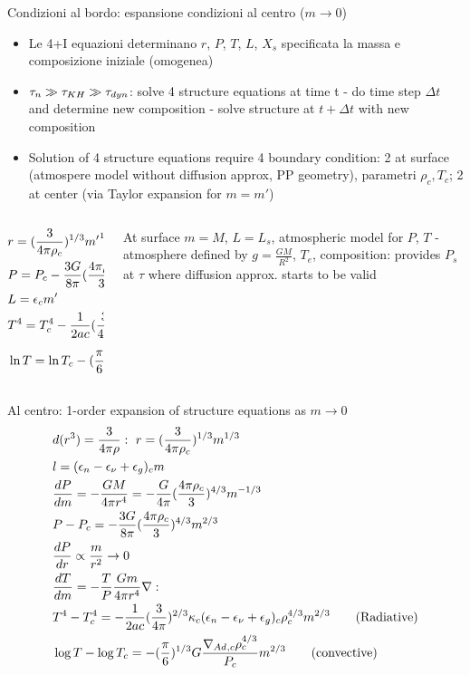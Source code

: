\begin{frame}{Condizioni al bordo: espansione condizioni al centro ($m\to0$)}
\begin{itemize}
\item Le 4+I equazioni determinano $r$, $P$, $T$, $L$, $X_s$ specificata la massa e composizione iniziale (omogenea)
\item $\tau_n\gg\tau_{KH}\gg\tau_{dyn}$: solve 4 structure equations at time t - do time step $\Delta t$ and determine new composition - solve structure at $t+\Delta t$ with new composition
\item Solution of 4 structure equations require 4 boundary condition: 2 at surface (atmospere model without diffusion approx, PP geometry), parametri $\rho_c,T_c$; 2 at center (via Taylor expansion for $m=m'$)
\end{itemize}
\begin{columns}[T]
\begin{column}{0.65\textwidth}
\begin{align*}
&r=(\frac{3}{4\pi\rho_c})^{1/3}{m'}^{1/3}\\
&P=P_c-\frac{3G}{8\pi}(\frac{4\pi\rho_c}{3})^{4/3}{m'}^{2/3}\\
&L=\epsilon_cm'\\
&T^4=T_c^4-\frac{1}{2ac}(\frac{3}{4\pi})^{2/3}\kappa_c\epsilon_c\rho_c^{4/3}{m'}^{2/3}\tag*{rad}\\
&\ln{T}=\ln{T_c}-(\frac{\pi}{6})^{1/3}G\frac{{\nabla_{Ad}}_c\rho_c^{4/3}}{P_c}{m'}^{2/3}\tag*{con}
\end{align*}
\end{column}
\begin{column}{0.35\textwidth}
At surface $m=M$, $L=L_s$, atmospheric model for $P$, $T$ - atmosphere defined by $g=\frac{GM}{R^2}$, $T_e$, composition: provides $P_s$ at $\tau$ where diffusion approx. starts to be valid
\end{column}
\end{columns}
\end{frame}

\begin{frame}[fragile]{Al centro: 1-order expansion of structure equations as $m\to0$}
	\begin{align*}
	&d(r^3)=\frac{3}{4\pi\rho}:\ r=(\frac{3}{4\pi\rho_c})^{1/3}m^{1/3}\\
	&l=(\epsilon_n-\epsilon_{\nu}+\epsilon_g)_cm\\
	&\TDy{m}{P}=-\frac{GM}{4\pi r^4}=-\frac{G}{4\pi}(\frac{4\pi\rho_c}{3})^{4/3}m^{-1/3}\\
	&P-P_c=-\frac{3G}{8\pi}(\frac{4\pi\rho_c}{3})^{4/3}m^{2/3}\\
	&\TDy{r}{P}\propto\frac{m}{r^2}\to0\\
	&\TDy{m}{T}=-\frac{T}{P}\frac{Gm}{4\pi r^4}\nabla:\\
	&T^4-T_c^4=-\frac{1}{2ac}(\frac{3}{4\pi})^{2/3}\kappa_c(\epsilon_n-\epsilon_{\nu}+\epsilon_g)_c\rho_c^{4/3}m^{2/3}\tag{Radiative}\\
	&\log{T}-\log{T_c}=-(\frac{\pi}{6})^{1/3}G\frac{\nad{}_{,c}\rho_c^{4/3}}{P_c}m^{2/3}\tag{convective}
	\end{align*}
\end{frame}


